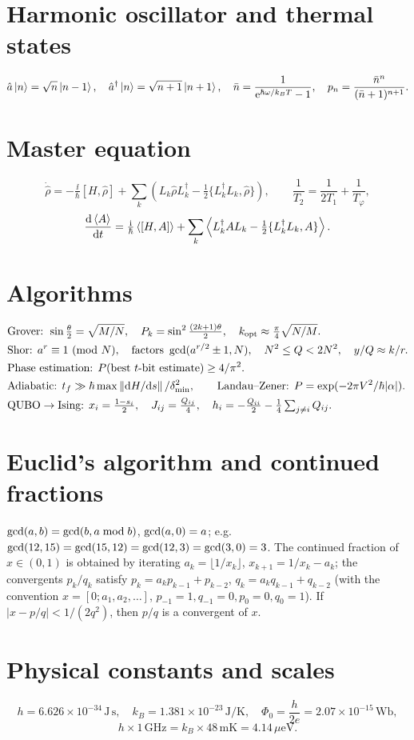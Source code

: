\section*{Harmonic oscillator and thermal states}
\[
  \hat a\left|n\right\rangle=\sqrt n\left|n-1\right\rangle,\quad\hat a^\dagger\left|n\right\rangle=\sqrt{n+1}\left|n+1\right\rangle,\quad\bar n=\frac1{\mathrm e^{\hbar\omega/k_BT}-1},\quad p_n=\frac{\bar n^n}{(\bar n+1)^{n+1}} .
\]

\section*{Master equation}
\[
  \dot{\hat\rho}=-\tfrac\ii\hbar[H,\hat\rho]+\sum_k\left(L_k\hat\rho L_k^\dagger-\tfrac12\{L_k^\dagger L_k,\hat\rho\}\right),\qquad\frac1{T_2}=\frac1{2T_1}+\frac1{T_\varphi},\]
\[
  \frac{\mathrm d\left\langle A\right\rangle}{\mathrm d t}=\tfrac{\mathrm i}\hbar\left\langle[H,A]\right\rangle+\sum_k\left\langle L_k^\dagger AL_k-\tfrac12\{L_k^\dagger L_k,A\}\right\rangle.
\]

\section*{Algorithms}
\begin{align*}
  &\text{Grover: }\sin\tfrac\theta2=\sqrt{M/N},\quad P_k=\sin^2\tfrac{(2k+1)\theta}2,\quad k_{\rm opt}\approx\tfrac\pi4\sqrt{N/M}.\\
  &\text{Shor: }a^r\equiv1\ (\mathrm{mod}\ N),\quad\text{factors }\operatorname{gcd}(a^{r/2}\pm1,N),\quad N^2\le Q<2N^2,\quad y/Q\approx k/r.\\
  &\text{Phase estimation: }P(\text{best }t\text{-bit estimate})\ge4/\pi^2.\\
  &\text{Adiabatic: }t_f\gg\hbar\max\left\|\mathrm d H/\mathrm d s\right\|/\delta_{\min}^2,\qquad\text{Landau--Zener: }P=\exp(-2\pi V^2/\hbar|\alpha|).\\
  &\text{QUBO}\to\text{Ising: }x_i=\tfrac{1-s_i}2,\quad J_{ij}=\tfrac{Q_{ij}}4,\quad h_i=-\tfrac{Q_{ii}}2-\tfrac14\textstyle\sum_{j\neq i}Q_{ij}.
\end{align*}

\section*{Euclid's algorithm and continued fractions}
$\operatorname{gcd}(a,b)=\operatorname{gcd}(b,a\bmod b)$, $\operatorname{gcd}(a,0)=a$; e.g.\ $\operatorname{gcd}(12,15)=\operatorname{gcd}(15,12)=\operatorname{gcd}(12,3)=\operatorname{gcd}(3,0)=3$. The continued fraction of $x\in(0,1)$ is obtained by iterating $a_k=\lfloor1/x_k\rfloor$, $x_{k+1}=1/x_k-a_k$; the
convergents $p_k/q_k$ satisfy $p_k=a_kp_{k-1}+p_{k-2}$, $q_k=a_kq_{k-1}+q_{k-2}$ (with the convention $x=[0;a_1,a_2,\dots]$, $p_{-1}=1,q_{-1}=0,p_0=0,q_0=1$). If $|x-p/q|<1/(2q^2)$, then $p/q$ is a convergent of $x$.

\section*{Physical constants and scales}
\[
  h=6.626\times10^{-34}\,\mathrm{J\,s},\quad k_B=1.381\times10^{-23}\,\mathrm{J/K},\quad\Phi_0=\frac h{2e}=2.07\times10^{-15}\,\mathrm{Wb},\]
\[
  h\times1\,\mathrm{GHz}=k_B\times48\,\mathrm{mK}=4.14\,\mu\mathrm{eV}.
\]
